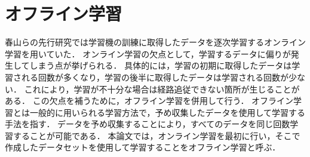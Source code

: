\newpage
\section{オフライン学習}
春山らの先行研究では学習機の訓練に取得したデータを逐次学習するオンライン学習を用いていた．
オンライン学習の欠点として，学習するデータに偏りが発生してしまう点が挙げられる．
具体的には，学習の初期に取得したデータは学習される回数が多くなり，学習の後半に取得したデータは学習される回数が少ない．
これにより，学習が不十分な場合は経路追従できない箇所が生じることがある．
この欠点を補うために，オフライン学習を併用して行う．
オフライン学習とは一般的に用いられる学習方法で，予め収集したデータを使用して学習する手法を指す．
データを予め収集することにより，すべてのデータを同じ回数学習することが可能である．
本論文では，オンライン学習を最初に行い，そこで作成したデータセットを使用して学習することをオフライン学習と呼ぶ．
